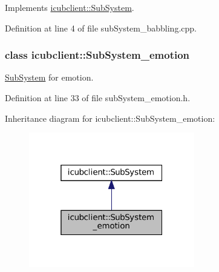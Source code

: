 Implements \hyperlink{group__icubclient__subsystems_a5fc84b6e51ec56f91323280b7da52dc8}{icubclient\+::\+Sub\+System}.



Definition at line 4 of file sub\+System\+\_\+babbling.\+cpp.

\label{classicubclient_1_1SubSystem__emotion}
\subsubsection{class icubclient\+:\+:Sub\+System\+\_\+emotion}
\hyperlink{group__icubclient__subsystems_classicubclient_1_1SubSystem}{Sub\+System} for emotion. 

Definition at line 33 of file sub\+System\+\_\+emotion.\+h.



Inheritance diagram for icubclient\+:\+:Sub\+System\+\_\+emotion\+:
\nopagebreak
\begin{figure}[H]
\begin{center}
\leavevmode
\includegraphics[width=205pt]{classicubclient_1_1SubSystem__emotion__inherit__graph}
\end{center}
\end{figure}
